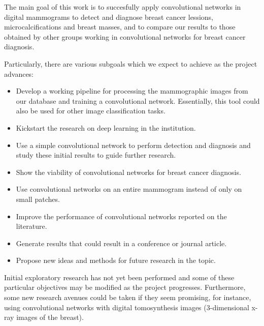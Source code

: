 The main goal of this work is to succesfully apply convolutional networks in digital mammograms to detect and diagnose breast cancer lessions, microcalcifications and breast masses, and to compare our results to those obtained by other groups working in convolutional networks for breast cancer diagnosis.

Particularly, there are various subgoals which we expect to achieve as the project advances:
\begin{itemize}
	\item Develop a working pipeline for processing the mammographic images from our database and training a convolutional network. Essentially, this tool could also be used for other image classification tasks.
	\item Kickstart the research on deep learning in the institution.
	\item Use a simple convolutional network to perform detection and diagnosis and study these initial results to guide further research.
	\item Show the viability of convolutional networks for breast cancer diagnosis.
	\item Use convolutional networks on an entire mammogram instead of only on small patches.
	\item Improve the performance of convolutional networks reported on the literature.
	\item Generate results that could result in a conference or journal article.
	\item Propose new ideas and methods for future research in the topic.
\end{itemize}
Initial exploratory research has not yet been performed and some of these particular objectives may be modified as the project progresses. Furthermore, some new research avenues could be taken if they seem promising, for instance, using convolutional networks with digital tomosynthesis images (3-dimensional x-ray images of the breast).


